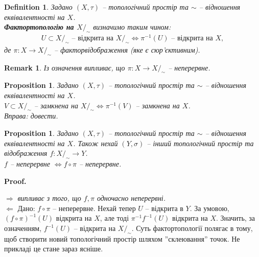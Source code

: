 \documentclass[a4paper, 10pt]{article}
\makeatletter
\def\rightproof{$\boxed{\Rightarrow}$ }
\def\leftproof{$\boxed{\Leftarrow}$ }
\theoremstyle{theoremdd}
\newtheorem{definition}[theorem]{Definition}
\newtheorem{proposition}[theorem]{Proposition}
\newtheorem{remark}[theorem]{Remark}
\renewenvironment{proof}[1][Proof.\\]{\par
\pushQED{\hfill \qed}%
\normalfont \topsep6\p@\@plus6\p@\relax
\trivlist
\item\relax
{\bfseries
#1\@addpunct{.}}\hspace\labelsep\ignorespaces
}{%
\popQED\endtrivlist\@endpefalse
}
\makeatother
\begin{document}
\begin{definition}
Задано $(X,\tau)$ -- топологічний простір та $\sim$ -- відношення еквівалентності на $X$.\\
\textbf{Фактортопологію на $X/_\sim$} визначимо таким чином:
\begin{align*}
U \subset X/_\sim \text{ -- відкрита на } X/_\sim \iff \pi^{-1}(U) \text{ -- відкрита на }X,
\end{align*}
де $\pi \colon X \to X/_\sim$ -- факторвідображення (яке є сюр'єктивним).
\end{definition}

\begin{remark}
Із означення випливає, що $\pi \colon X \to X/_\sim$ -- неперервне.
\end{remark}

\begin{proposition}
Задано $(X,\tau)$ -- топологічний простір та $\sim$ -- відношення еквівалентності на $X$.\\
$V \subset X/_\sim$ -- замкнена на $X/_\sim \iff \pi^{-1}(V)$ -- замкнена на $X$.\\
\textit{Вправа: довести.}
\end{proposition}

\begin{proposition}
Задано $(X,\tau)$ -- топологічний простір та $\sim$ -- відношення еквівалентності на $X$. Також нехай $(Y,\sigma)$ -- інший топологічний простір та відображення $f \colon X/_\sim \to Y$.\\
$f$ -- неперервне $\iff f \circ \pi$ -- неперервне.
\end{proposition}

\begin{proof}
\rightproof \textit{випливає з того, що $f,\pi$ одночасно неперервні.}
\bigskip \\
\leftproof Дано: $f \circ \pi$ -- неперервне. Нехай тепер $U$ -- відкрита в $Y$. За умовою, $(f \circ \pi)^{-1}(U)$ відкрита на $X$, але тоді $\pi^{-1} f^{-1}(U)$ відкрита на $X$. Значить, за означенням, $f^{-1}(U)$ -- відкрита на $X/_\sim$.
\end{proof}
\noindent
Суть фактортопології полягає в тому, щоб створити новий топологічний простір шляхом ''склеювання'' точок. Не прикладі це стане зараз ясніше.
\end{document}
